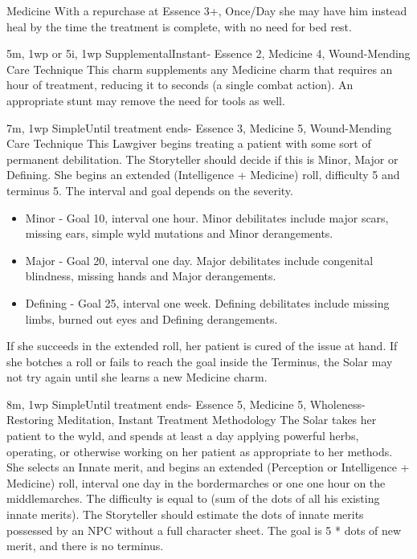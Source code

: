 \begin{Ability}{Medicine}
  With a repurchase at Essence 3+, Once/Day she may have him instead heal by the time the treatment is complete, with no need for bed rest.

  {5m, 1wp or 5i, 1wp}
  {Supplemental}{Instant}{-}
  {Essence 2, Medicine 4, Wound-Mending Care Technique}
  This charm supplements any Medicine charm that requires an hour of treatment, reducing it to seconds (a single combat action). An appropriate stunt may remove the need for tools as well.

  {7m, 1wp}
  {Simple}{Until treatment ends}{-}
  {Essence 3, Medicine 5, Wound-Mending Care Technique}
  This Lawgiver begins treating a patient with some sort of permanent debilitation. The Storyteller should decide if this is Minor, Major or Defining. She begins an extended (Intelligence + Medicine) roll, difficulty 5 and terminus 5. The interval and goal depends on the severity.

  \begin{itemize}
    \item Minor - Goal 10, interval one hour. Minor debilitates include major scars, missing ears, simple wyld mutations and Minor derangements.
    \item Major - Goal 20, interval one day. Major debilitates include congenital blindness, missing hands and Major derangements.
    \item Defining - Goal 25, interval one week. Defining debilitates include missing limbs, burned out eyes and Defining derangements.
  \end{itemize}

  If she succeeds in the extended roll, her patient is cured of the issue at hand. If she botches a roll or fails to reach the goal inside the Terminus, the Solar may not try again until she learns a new Medicine charm.

  {8m, 1wp}
  {Simple}{Until treatment ends}{-}
  {Essence 5, Medicine 5, Wholeness-Restoring Meditation, Instant Treatment Methodology}
  The Solar takes her patient to the wyld, and spends at least a day applying powerful herbs, operating, or otherwise working on her patient as appropriate to her methods. She selects an Innate merit, and begins an extended (Perception or Intelligence + Medicine) roll, interval one day in the bordermarches or one one hour on the middlemarches. The difficulty is equal to (sum of the dots of all his existing innate merits). The Storyteller should estimate the dots of innate merits possessed by an NPC without a full character sheet. The goal is 5 * dots of new merit, and there is no terminus.


\end{Ability}
